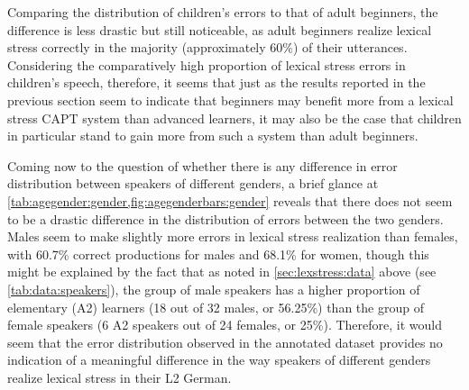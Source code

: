 				Comparing the distribution of children's errors to that of adult beginners, the difference is less drastic but still noticeable, as adult beginners realize lexical stress correctly in the majority (approximately 60\%) of their utterances. Considering the comparatively high proportion of lexical stress errors in children's speech, therefore, it seems that 
				just as the results reported in the previous section seem to indicate that beginners may benefit more from a lexical stress CAPT system than advanced learners, 
				it may also be the case that
				children in particular stand to gain more from such a system than adult beginners.
%				
				
					Coming now to the question of whether there is any difference in error distribution between speakers of different genders, a brief glance at \cref{tab:agegender:gender,fig:agegenderbars:gender} reveals that there does not seem to be a drastic difference in the distribution of errors between the two genders. Males seem to make slightly more errors in lexical stress realization than females, with 60.7\% correct productions for males and 68.1\% for women, though this might be explained by the fact that as noted in \cref{sec:lexstress:data} above (see \cref{tab:data:speakers}), the group of male speakers has a higher proportion of elementary (A2) learners (18 out of 32 males, or 56.25\%) than the group of female speakers (6 A2 speakers out of 24 females, or 25\%). Therefore, it would seem that the error distribution observed in the annotated dataset provides no indication of a meaningful difference in the way speakers of different genders realize lexical stress in their L2 German.
				
					
			
			
			
